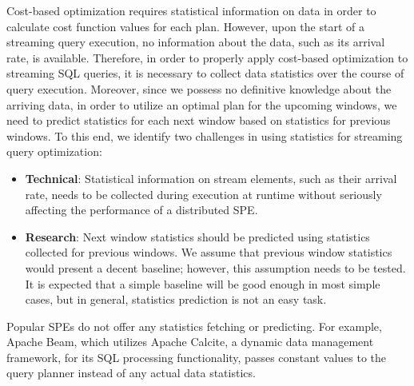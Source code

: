 Cost-based optimization requires statistical information on data in order to calculate cost function values for each plan. However, upon the start of a streaming query execution, no information about the data, such as its arrival rate, is available. Therefore, in order to properly apply cost-based optimization to streaming SQL queries, it is necessary to collect data statistics over the course of query execution. Moreover, since we possess no definitive knowledge about the arriving data, in order to utilize an optimal plan for the upcoming windows, we need to predict statistics for each next window based on statistics for previous windows. To this end, we identify two challenges in using statistics for streaming query optimization:

\begin{itemize}
    \item \textbf{Technical}:
    Statistical information on stream elements, such as their arrival rate, needs to be collected during execution at runtime without seriously affecting the performance of a distributed SPE. %
    \item \textbf{Research}:
    Next window statistics should be predicted using statistics collected for previous windows. We assume that previous window statistics would present a decent baseline; however, this assumption needs to be tested. It is expected that a simple baseline will be good enough in most simple cases, but in general, statistics prediction is not an easy task.
\end{itemize}

Popular SPEs do not offer any statistics fetching or predicting. For example, Apache Beam, which utilizes Apache Calcite, a dynamic data management framework, for its SQL processing functionality, passes constant values to the query planner instead of any actual data statistics.

